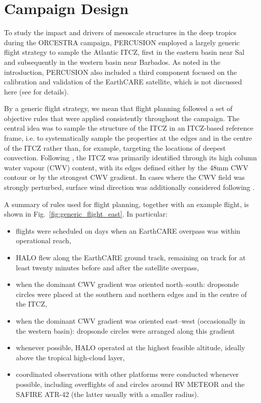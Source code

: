 \documentclass{article}
\begin{document}
\section{Campaign Design}
\label{sec:campaign_design}


To study the impact and drivers of mesoscale structures in the deep tropics during the ORCESTRA campaign, PERCUSION employed a largely generic flight strategy to sample the Atlantic ITCZ, first in the eastern basin near Sal and subsequently in the western basin near Barbados. As noted in the introduction, PERCUSION also included a third component focused on the calibration and validation of the EarthCARE satellite, which is not discussed here (see \cite{grossPersistentEarthCAREUnderflight2026} for details).

By a generic flight strategy, we mean that flight planning followed a set of objective rules that were applied consistently throughout the campaign. The central idea was to sample the structure of the ITCZ in an ITCZ-based reference frame, i.e. to systematically sample the properties at the edges and in the centre of the ITCZ rather than, for example, targeting the locations of deepest convection. Following \cite{Mapes2018}, the ITCZ was primarily identified through its high column water vapour (CWV) content, with its edges defined either by the 48mm CWV contour or by the strongest CWV gradient. In cases where the CWV field was strongly perturbed, surface wind direction was additionally considered following \cite{windmillerInnerLifeAtlantic2024}.

A summary of rules used for flight planning, together with an example flight, is shown in Fig.~\ref{fig:generic_flight_east}. 
In particular:
\begin{itemize}
\item flights were scheduled on days when an EarthCARE overpass was within operational reach,
\item HALO flew along the EarthCARE ground track, remaining on track for at least twenty minutes before and after the satellite overpass,
\item when the dominant CWV gradient was oriented north--south: dropsonde circles were placed at the southern and northern edges and in the centre of the ITCZ,
\item when the dominant CWV gradient was oriented east--west (occasionally in the western basin): dropsonde circles were arranged along this gradient
\item whenever possible, HALO operated at the highest feasible altitude, ideally above the tropical high-cloud layer,
\item coordinated observations with other platforms were conducted whenever possible, including overflights of and circles around RV METEOR and the SAFIRE ATR-42 (the latter usually with a smaller radius).
\end{itemize}
\end{document}
